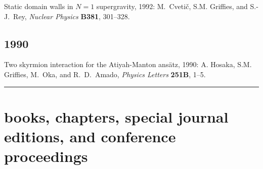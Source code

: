 \begin{etaremune}
\item Static domain walls in $N=1$ supergravity, 1992: M.\ Cveti\v c, S.M. Grif\/f\/ies, and S.-J.\ Rey, {\em Nuclear Physics} {\bf B381}, 301--328.

\subsection*{\sc \color{Maroon} 1990}

\item Two skyrmion interaction for the Atiyah-Manton ans\"atz, 1990:  A. Hosaka, S.M. Grif\/f\/ies, M.\ Oka, and R.\ D.\ Amado, {\it Physics Letters} {\bf 251B}, 1--5.


\end{etaremune}

\noindent\rule{\textwidth}{1pt}
\vspace{-1cm}
\section*{\sc \color{Maroon} books, chapters, special journal editions, and conference proceedings}


